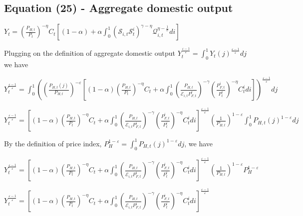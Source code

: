 \documentclass[
]{article}
\begin{document}
\vspace{12pt}

\hypertarget{equation-25---aggregate-domestic-output}{%
\subsection{Equation (25) - Aggregate domestic
output}\label{equation-25---aggregate-domestic-output}}

\(\displaystyle Y_t = \left( \frac{P_{H,t}}{P_t} \right)^{-\eta}C_t \left[ (1-\alpha) + \alpha \int_0^1 \left( \mathcal{S}_{i,t} \mathcal{S}_t^i\right)^{\gamma-\eta} \mathcal{Q}_{i,t}^{\eta-\frac{1}{\sigma}} di \right]\)

\vspace{8pt}

Plugging on the definition of aggregate domestic output
\(\displaystyle Y_t^{\frac{\varepsilon-1}{\varepsilon}}= \int_0^1Y_t(j)^{\frac{\varepsilon-1}{\varepsilon}}dj\)
we have

\(\displaystyle Y_t^{\frac{\varepsilon-1}{\varepsilon}} = \int_0^1 \left( \left( \frac{P_{H,t}(j)}{P_{H,t}}\right)^{-\varepsilon} \left[ (1-\alpha)\left( \frac{P_{H,t}}{P_t} \right)^{-\eta}C_t + \alpha \int_0^1 \left( \frac{P_{H,t}}{\mathcal{E}_{i,t}P_{F,t}^i}\right)^{-\gamma} \left( \frac{P_{F,t}^i}{P_t^i} \right)^{-\eta} C_t^i di \right] \right)^{\frac{\varepsilon-1}{\varepsilon}}dj\)

\(\displaystyle Y_t^{\frac{\varepsilon-1}{\varepsilon}} = \left[ (1-\alpha)\left( \frac{P_{H,t}}{P_t} \right)^{-\eta}C_t + \alpha \int_0^1 \left( \frac{P_{H,t}}{\mathcal{E}_{i,t}P_{F,t}^i}\right)^{-\gamma} \left( \frac{P_{F,t}^i}{P_t^i} \right)^{-\eta} C_t^i di \right]^{\frac{\varepsilon-1}{\varepsilon}} \left( \frac{1}{P_{H,t}}\right)^{1-\varepsilon} \int_0^1 P_{H,t}(j) ^{1-\varepsilon} dj\)

By the definition of price index,
\(\displaystyle P_H^{1-\varepsilon} = \int_0^1 P_{H,t}(j)^{1-\varepsilon}dj\),
we have

\(\displaystyle Y_t^{\frac{\varepsilon-1}{\varepsilon}} = \left[ (1-\alpha)\left( \frac{P_{H,t}}{P_t} \right)^{-\eta}C_t + \alpha \int_0^1 \left( \frac{P_{H,t}}{\mathcal{E}_{i,t}P_{F,t}^i}\right)^{-\gamma} \left( \frac{P_{F,t}^i}{P_t^i} \right)^{-\eta} C_t^i di \right]^{\frac{\varepsilon-1}{\varepsilon}} \left( \frac{1}{P_{H,t}}\right)^{1-\varepsilon} P_H^{1-\varepsilon}\)

\(\displaystyle Y_t^{\frac{\varepsilon-1}{\varepsilon}} = \left[ (1-\alpha)\left( \frac{P_{H,t}}{P_t} \right)^{-\eta}C_t + \alpha \int_0^1 \left( \frac{P_{H,t}}{\mathcal{E}_{i,t}P_{F,t}^i}\right)^{-\gamma} \left( \frac{P_{F,t}^i}{P_t^i} \right)^{-\eta} C_t^i di \right]^{\frac{\varepsilon-1}{\varepsilon}}\)
\end{document}
